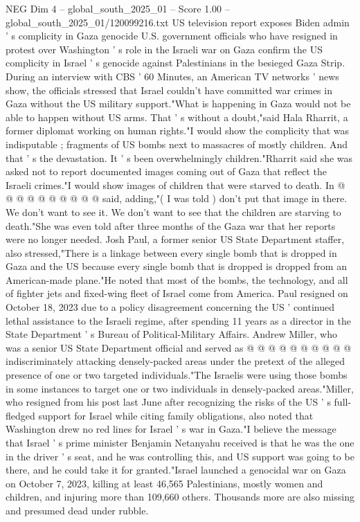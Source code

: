 \begin{textsample}{NEG Dim 4 – global\_south\_2025\_01 – Score 1.00 – global\_south\_2025\_01/120099216.txt}  \label{ex:f4_neg_444}
US television report exposes Biden admin ' s complicity in Gaza genocide U.S. government officials who have resigned in protest over Washington ' s role in the Israeli war on Gaza confirm the US complicity in Israel ' s genocide against Palestinians in the besieged Gaza Strip.
During an interview with CBS ' 60 Minutes, an American TV networks ' news show, the officials stressed that Israel couldn't have committed war crimes in Gaza without the US military support."What is happening in Gaza would not be able to happen without US arms.
That ' s without a doubt,"said Hala Rharrit, a former diplomat working on human rights."I would show the complicity that was indisputable ; fragments of US bombs next to massacres of mostly children.
And that ' s the devastation.
It ' s been overwhelmingly children."Rharrit said she was asked not to report documented images coming out of Gaza that reflect the Israeli crimes."I would show images of children that were starved to death.
In @ @ @ @ @ @ @ @ @ @ said, adding,"( I was told ) don't put that image in there.
We don't want to see it.
We don't want to see that the children are starving to death."She was even told after three months of the Gaza war that her reports were no longer needed.
Josh Paul, a former senior US State Department staffer, also stressed,"There is a linkage between every single bomb that is dropped in Gaza and the US because every single bomb that is dropped is dropped from an American-made plane."He noted that most of the bombs, the technology, and all of fighter jets and fixed-wing fleet of Israel come from America.
Paul resigned on October 18, 2023 due to a policy disagreement concerning the US ' continued lethal assistance to the Israeli regime, after spending 11 years as a director in the State Department ' s Bureau of Political-Military Affairs.
Andrew Miller, who was a senior US State Department official and served as @ @ @ @ @ @ @ @ @ @ indiscriminately attacking densely-packed areas under the pretext of the alleged presence of one or two targeted individuals."The Israelis were using those bombs in some instances to target one or two individuals in densely-packed areas."Miller, who resigned from his post last June after recognizing the risks of the US ' s full-fledged support for Israel while citing family obligations, also noted that Washington drew no red lines for Israel ' s war in Gaza."I believe the message that Israel ' s prime minister Benjamin Netanyahu received is that he was the one in the driver ' s seat, and he was controlling this, and US support was going to be there, and he could take it for granted."Israel launched a genocidal war on Gaza on October 7, 2023, killing at least 46,565 Palestinians, mostly women and children, and injuring more than 109,660 others.
Thousands more are also missing and presumed dead under rubble.

\end{textsample}
